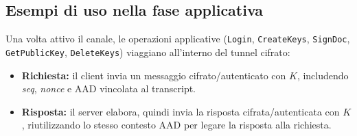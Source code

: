 \subsection{Esempi di uso nella fase applicativa}
Una volta attivo il canale, le operazioni applicative (\texttt{Login}, \texttt{CreateKeys}, \texttt{SignDoc}, \texttt{GetPublicKey}, \texttt{DeleteKeys}) viaggiano all'interno del tunnel cifrato:
\begin{itemize}
  \item \textbf{Richiesta:} il client invia un messaggio cifrato/autenticato con $K$, includendo \emph{seq}, \emph{nonce} e AAD vincolata al transcript.
  \item \textbf{Risposta:} il server elabora, quindi invia la risposta cifrata/autenticata con $K$, riutilizzando lo stesso contesto AAD per legare la risposta alla richiesta.
\end{itemize}
